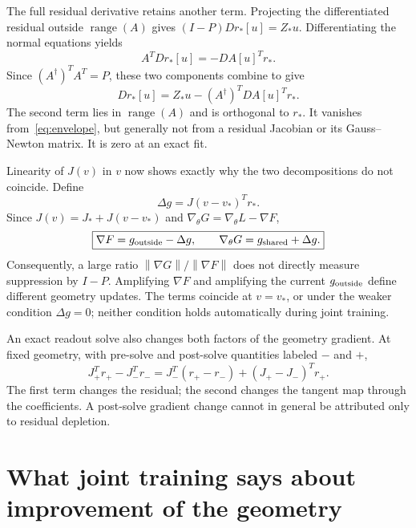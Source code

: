 \documentclass[11pt]{article}
\theoremstyle{remark}
\newcommand{\norm}[1]{\left\lVert #1\right\rVert}
\newcommand{\range}{\operatorname{range}}
\begin{document}
The full residual derivative retains another term. Projecting the differentiated residual outside $\range(A)$ gives $(I-P)Dr_*[u]=Z_*u$. Differentiating the normal equations yields
\begin{equation}
 A^TDr_*[u]=-DA[u]^Tr_*.
\end{equation}
Since $(A^\dagger)^TA^T=P$, these two components combine to give
\begin{equation}
 \boxed{Dr_*[u]=Z_*u-(A^\dagger)^TDA[u]^Tr_*.}
 \label{eq:residual-derivative}
\end{equation}
The second term lies in $\range(A)$ and is orthogonal to $r_*$. It vanishes from~\eqref{eq:envelope}, but generally not from a residual Jacobian or its Gauss--Newton matrix. It is zero at an exact fit.

Linearity of $J(v)$ in $v$ now shows exactly why the two decompositions do not coincide. Define
\begin{equation}
 \Delta g=J(v-v_*)^Tr_*.
\end{equation}
Since $J(v)=J_*+J(v-v_*)$ and $\nabla_\theta G=\nabla_\theta L-\nabla F$,
\begin{equation}
 \boxed{\nabla F=g_{\rm outside}-\Delta g,\qquad
 \nabla_\theta G=g_{\rm shared}+\Delta g.}
 \label{eq:mismatch}
\end{equation}
Consequently, a large ratio $\norm{\nabla G}/\norm{\nabla F}$ does not directly measure suppression by $I-P$. Amplifying $\nabla F$ and amplifying the current $g_{\rm outside}$ define different geometry updates. The terms coincide at $v=v_*$, or under the weaker condition $\Delta g=0$; neither condition holds automatically during joint training.

An exact readout solve also changes both factors of the geometry gradient. At fixed geometry, with pre-solve and post-solve quantities labeled $-$ and $+$,
\begin{equation}
 J_+^Tr_+-J_-^Tr_-
 =J_-^T(r_+-r_-)+(J_+-J_-)^Tr_+.
 \label{eq:readout-replacement}
\end{equation}
The first term changes the residual; the second changes the tangent map through the coefficients. A post-solve gradient change cannot in general be attributed only to residual depletion.

\section{What joint training says about improvement of the geometry}
\end{document}
